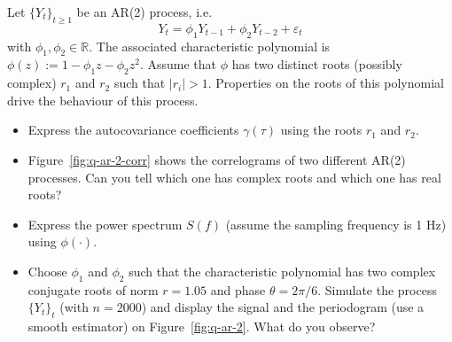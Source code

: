 \documentclass[11pt]{article}
\begin{document}
\begin{exercise}[subtitle=AR(2) process]
Let $\{Y_t\}_{t\geq 1}$ be an AR(2) process, i.e.
\begin{equation}
    Y_t = \phi_1 Y_{t-1} + \phi_2 Y_{t-2} + \varepsilon_t
\end{equation}
with $\phi_1, \phi_2\in\mathbb{R}$.
The associated characteristic polynomial is $\phi(z):=1-\phi_1 z - \phi_2 z^2$.
Assume that $\phi$ has two distinct roots (possibly complex) $r_1$ and $r_2$ such that $|r_i|>1$.
Properties on the roots of this polynomial drive the behaviour of this process.


\begin{itemize}
    \item Express the autocovariance coefficients $\gamma(\tau)$ using the roots $r_1$ and $r_2$.
    \item Figure~\ref{fig:q-ar-2-corr} shows the correlograms of two different AR(2) processes. Can you tell which one has complex roots and which one has real roots?
    \item Express the power spectrum $S(f)$ (assume the sampling frequency is 1 Hz) using $\phi(\cdot)$.
    \item Choose $\phi_1$ and $\phi_2$ such that the characteristic polynomial has two complex conjugate roots of norm $r=1.05$ and phase $\theta=2\pi/6$. Simulate the process $\{Y_t\}_t$ (with $n=2000$) and display the signal and the periodogram (use a smooth estimator) on Figure~\ref{fig:q-ar-2}. What do you observe?
\end{itemize}




\end{exercise}
\end{document}
